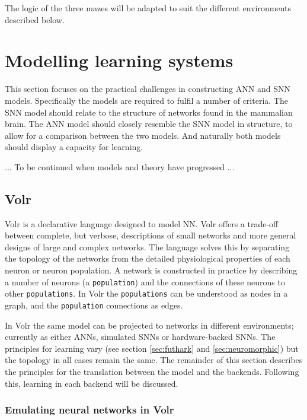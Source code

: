 The logic of the three mazes will be adapted to suit the different environments described below.

\section{Modelling learning systems} \label{sec:learning}
This section focuses on the practical challenges in constructing ANN and SNN models.
Specifically the models are required to fulfil a number of criteria.
The SNN model should relate to the structure of networks found in the mammalian brain.
The ANN model should closely resemble the SNN model in structure, to allow for a comparison between the two models.
And naturally both models should display a capacity for learning.

... To be continued when models and theory have progressed ...

\subsection{Volr}
Volr is a declarative language designed to model \gls{NN}.
Volr offers a trade-off between complete, but verbose, descriptions of small networks and more general designs of large and complex networks.
The language solves this by separating the topology of the networks from the detailed physiological properties of each neuron or neuron population.
A network is constructed in practice by describing a number of neurons (a \texttt{population}) and the connections of these neurons to other \texttt{populations}.
In Volr the \texttt{populations} can be understood as nodes in a graph, and the \texttt{population} connections as edges.


In Volr the same model can be projected to networks in different environments; currently as either ANNs, simulated SNNs or hardware-backed SNNs.
The principles for learning vary (see section \ref{sec:futhark} and \ref{sec:neuromorphic}) but the topology in all cases remain the same.
The remainder of this section describes the principles for the translation between the model and the backends.
Following this, learning in each backend will be discussed.

\subsubsection{Emulating neural networks in Volr}


